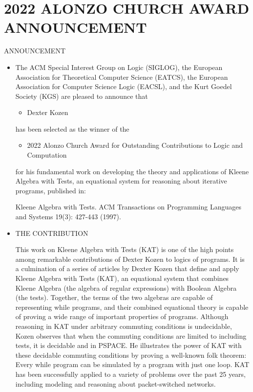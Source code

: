 \documentclass[prodmode,acmtecs]{acmsmall} %
\begin{document}
\section{2022 ALONZO CHURCH AWARD ANNOUNCEMENT}\label{2022ALONZOCHURCHAWARDANNOUNCEMENT}ANNOUNCEMENT 

\begin{itemize}\item  The ACM Special Interest Group on Logic (SIGLOG), the European Association for Theoretical Computer Science (EATCS), the European Association for Computer Science Logic (EACSL), and the Kurt Goedel Society (KGS) are pleased to announce that  
 
\begin{itemize}\item  Dexter Kozen
\end{itemize} 
  has been selected as the winner of the  
 
\begin{itemize}\item  2022 Alonzo Church Award for Outstanding Contributions to Logic and Computation
\end{itemize} 
  for his fundamental work on developing the theory and applications of Kleene Algebra with Tests, an equational system for reasoning about iterative programs, published in: 
 
  Kleene Algebra with Tests. ACM Transactions on Programming Languages and Systems 19(3): 427-443 (1997). 
 
\item  THE CONTRIBUTION 
 
  This work on Kleene Algebra with Tests (KAT) is one of the high points among remarkable contributions of Dexter Kozen to logics of programs. It is a culmination of a series of articles by Dexter Kozen that define and apply Kleene Algebra with Tests (KAT), an equational system that combines Kleene Algebra (the algebra of regular expressions) with Boolean Algebra (the tests). Together, the terms of the two algebras are capable of representing while programs, and their combined equational theory is capable of proving a wide range of important properties of programs. Although reasoning in KAT under arbitrary commuting conditions is undecidable, Kozen observes that when the commuting conditions are limited to including tests, it is decidable and in PSPACE. He illustrates the power of KAT with these decidable commuting conditions by proving a well-known folk theorem: Every while program can be simulated by a program with just one loop. KAT has been successfully applied to a variety of problems over the past 25 years, including modeling and reasoning about packet-switched networks. 
 

\end{itemize}
\end{document}
